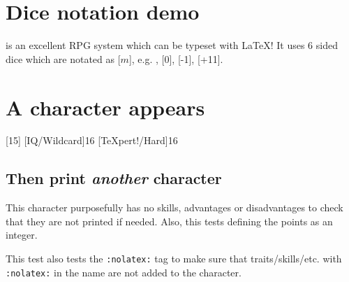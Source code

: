 \documentclass{article}
\begin{document}
\tableofcontents

\section{Dice notation demo}
\label{sec:dice-notation-demo}

\gurps is an excellent RPG system which can be typeset with \LaTeX{}! It uses 6
sided dice which are notated as [$m$], e.g. , [0], [-1], [+11].

\section{A character appears}
\label{sec:character-appears}

\begin{character}
  [15]
  [IQ/Wildcard]{16}
  [\TeX pert!/Hard]{16}

\end{character}

\subsection{Then print \emph{another} character }
\label{sec:then-print-emph}

This character purposefully has no skills, advantages or disadvantages to check
that they are not printed if needed. Also, this tests defining the points as an
integer.

This test also tests the \texttt{:nolatex:} tag to make sure that
traits/skills/etc. with \texttt{:nolatex:} in the name are not added to the character.
\end{document}
